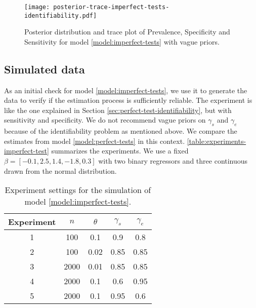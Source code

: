 \begin{figure}[ht]
  \centering
  \caption{\label{fig:posterior-trace-imperfect-tests-identifiability}Posterior
    distribution and trace plot of Prevalence, Specificity and Sensitivity for
    model \eqref{model:imperfect-tests} with vague priors.}
  \texttt{[image: posterior-trace-imperfect-tests-identifiability.pdf]}
\end{figure}

\subsection{Simulated data}

As an initial check for model \eqref{model:imperfect-tests}, we use it to
generate the data to verify if the estimation process is sufficiently
reliable. The experiment is like the one explained in Section
\ref{sec:perfect-test-identifiability}, but with sensitivity and specificity.
We do not recommend vague priors on $\gamma_s$ and $\gamma_e$ because of the
identifiability
problem as mentioned above. We compare the estimates from model
\eqref{model:perfect-tests} in this context. \autoref{table:experiments-imperfect-test} summarizes the
experiments. We use a fixed $\beta = [-0.1, 2.5, 1.4, -1.8, 0.3]$ with
two binary regressors and three continuous drawn from the normal distribution.

\begin{table}[!ht]
  \centering
  \caption{\label{table:experiments-imperfect-test}Experiment settings for the
    simulation of model \eqref{model:imperfect-tests}.}
  \begin{tabular}{ccccc}
    \hline
    Experiment            & $n$  & $\theta$ & $\gamma_s$ & $\gamma_e$ \\ \hline
    \multicolumn{1}{c}{1} & 100  & 0.1      & 0.9        & 0.8        \\
    \multicolumn{1}{c}{2} & 100  & 0.02     & 0.85       & 0.85       \\
    \multicolumn{1}{c}{3} & 2000 & 0.01     & 0.85       & 0.85       \\
    \multicolumn{1}{c}{4} & 2000 & 0.1      & 0.6        & 0.95       \\
    \multicolumn{1}{c}{5} & 2000 & 0.1      & 0.95       & 0.6        \\ \hline
  \end{tabular} 
\end{table}

